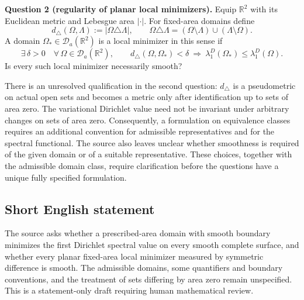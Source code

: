 \documentclass[11pt]{article}
\newcommand{\R}{\mathbb{R}}
\begin{document}
\textbf{Question 2 (regularity of planar local minimizers).} Equip $\R^2$ with its Euclidean metric and Lebesgue area $|\cdot|$. For fixed-area domains define
\[
d_\triangle(\Omega,\Lambda):=|\Omega\triangle\Lambda|,
\qquad
\Omega\triangle\Lambda=(\Omega\setminus\Lambda)\cup(\Lambda\setminus\Omega).
\]
A domain $\Omega_*\in\mathcal D_a(\R^2)$ is a local minimizer in this sense if
\[
\exists\,\delta>0\quad\forall\,\Omega\in\mathcal D_a(\R^2),\qquad
 d_\triangle(\Omega,\Omega_*)<\delta
 \ \Longrightarrow\ 
 \lambda_1^D(\Omega_* )\leq\lambda_1^D(\Omega).
\]
Is every such local minimizer necessarily smooth?

There is an unresolved qualification in the second question: $d_\triangle$ is a pseudometric on actual open sets and becomes a metric only after identification up to sets of area zero. The variational Dirichlet value need not be invariant under arbitrary changes on sets of area zero. Consequently, a formulation on equivalence classes requires an additional convention for admissible representatives and for the spectral functional. The source also leaves unclear whether smoothness is required of the given domain or of a suitable representative. These choices, together with the admissible domain class, require clarification before the questions have a unique fully specified formulation.
\subsection{Short English statement}
The source asks whether a prescribed-area domain with smooth boundary minimizes the first Dirichlet spectral value on every smooth complete surface, and whether every planar fixed-area local minimizer measured by symmetric difference is smooth. The admissible domains, some quantifiers and boundary conventions, and the treatment of sets differing by area zero remain unspecified. This is a statement-only draft requiring human mathematical review.
\end{document}
